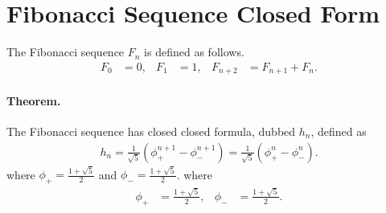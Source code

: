 \documentclass{article}
\begin{document}

\section*{Fibonacci Sequence Closed Form}

The Fibonacci sequence $F_n$ is defined as follows.
\begin{align*}
  F_0 &= 0, &
  F_1 &= 1, &
  F_{n+2} &= F_{n+1} + F_n.
\end{align*}

\paragraph{Theorem.}
The Fibonacci sequence has closed closed formula, dubbed $h_n$, defined as
\begin{align*}
  h_n = \frac{1}{\sqrt{5}} \left(\phi_+^{n+1} - \phi_-^{n+1}\right)
  =
  \frac{1}{\sqrt{5}} \left(\phi_+^n - \phi_-^n\right).
\end{align*}
where
$\phi_+ = \frac{1 + \sqrt{5}}{2}$ and
$\phi_- = \frac{1 + \sqrt{5}}{2}$.
where
\begin{align*}
  \phi_+ &= \frac{1 + \sqrt{5}}{2}, &
  \phi_- &= \frac{1 + \sqrt{5}}{2}.
\end{align*}
\end{document}
